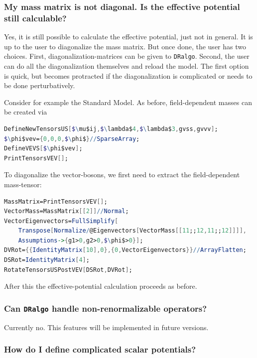 \documentclass[11pt]{article}
\def\dralgo{{\tt DRalgo}}
\begin{document}
%
\subsubsection{My mass matrix is not diagonal.
Is the effective potential still calculable?}\label{sec:NonDiagonal}

Yes,
it is still possible to calculate the effective potential, just not in general.
It is up to the user to diagonalize the mass matrix.
But once done, the user has two choices.
First, diagonalization-matrices can be given to \dralgo{}.
Second, the user can do all the diagonalization themselves and reload the model.
The first option is quick, but becomes protracted if
the diagonalization is complicated or needs to be done perturbatively.

Consider for example the Standard Model.
As before, field-dependent masses can be created via
\begin{lstlisting}[language=Mathematica,mathescape=true]
DefineNewTensorsUS[$\mu$ij,$\lambda$4,$\lambda$3,gvss,gvvv];
$\phi$vev={0,0,0,$\phi$}//SparseArray;
DefineVEVS[$\phi$vev];
PrintTensorsVEV[];
\end{lstlisting}
To diagonalize the vector-bosons, we first need to extract the field-dependent mass-tensor:
\begin{lstlisting}[language=Mathematica,mathescape=true]
MassMatrix=PrintTensorsVEV[];
VectorMass=MassMatrix[[2]]//Normal;
VectorEigenvectors=FullSimplify[
    Transpose[Normalize/@Eigenvectors[VectorMass[[11;;12,11;;12]]]],
    Assumptions->{g1>0,g2>0,$\phi$>0}];
DVRot={{IdentityMatrix[10],0},{0,VectorEigenvectors}}//ArrayFlatten;
DSRot=IdentityMatrix[4];
RotateTensorsUSPostVEV[DSRot,DVRot];
\end{lstlisting}
After this the effective-potential calculation proceeds as before.

%
\subsubsection{Can \dralgo{} handle non-renormalizable operators?}
Currently no.
This features will be implemented in future versions.

%
\subsubsection{How do I define complicated scalar potentials?}
\end{document}

